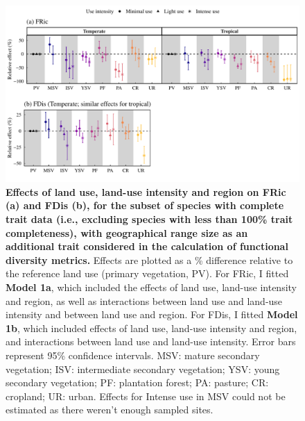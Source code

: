 \begin{figure}[h!]
\centering
\includegraphics[scale=0.7]{Supporting/Chapter3/Figures/SI_Figure19}
\caption[Effects of land use, land-use intensity and region on FRic (a) and FDis (b), for the subset of species with complete trait data, with geographical range size as an additional trait]{\textbf{Effects of land use, land-use intensity and region on FRic (a) and FDis (b), for the subset of species with complete trait data (i.e., excluding species with less than 100\% trait completeness), with geographical range size as an additional trait considered in the calculation of functional diversity metrics.} Effects are plotted as a \% difference relative to the reference land use (primary vegetation, PV). For FRic, I fitted \textbf{Model 1a}, which included the effects of land use, land-use intensity and region, as well as interactions between land use and land-use intensity and between land use and region. For FDis, I fitted \textbf{Model 1b}, which included effects of land use, land-use intensity and region, and interactions between land use and land-use intensity. Error bars represent 95\% confidence intervals. MSV: mature secondary vegetation; ISV: intermediate secondary vegetation; YSV: young secondary vegetation; PF: plantation forest; PA: pasture; CR: cropland; UR: urban. Effects for Intense use in MSV could not be estimated as there weren’t enough sampled sites.}
\label{SI3_F19}
\end{figure}

